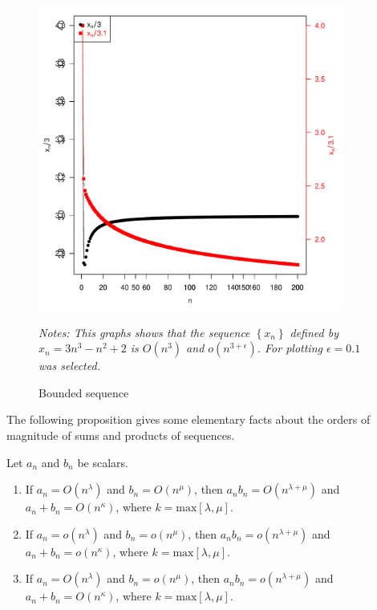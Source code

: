 \documentclass[english,12pt]{book}\usepackage[]{graphicx}\usepackage[]{xcolor}
\newenvironment{knitrout}{}{} %
\begin{document}
\begin{figure}[ht]
  \caption{Bounded sequence}
    \label{fig:SeqConvBond}
    \centering
    \begin{minipage}{.9\linewidth}
\begin{knitrout}
\color{fgcolor}

{\centering \includegraphics[width=10cm,height=10cm]{figure/SeqConvBoun-1} 

}


\end{knitrout}
\footnotesize
		\emph{Notes: This graphs shows that the sequence $\left\lbrace x_n\right\rbrace$ defined by $x_n = 3n^3 - n^2 + 2$ is $O(n^3)$ and $o(n^{3 + \epsilon})$. For plotting $\epsilon = 0.1$ was selected.}
	\end{minipage}
\end{figure}

The following proposition gives some elementary facts about the orders of magnitude of sums and products of sequences.

\begin{proposition}\label{prop:blO-nest}
Let $a_n$ and $b_n$ be scalars. 
\begin{enumerate}
  \item If $a_n=O(n^\lambda)$ and $b_n=O(n^\mu)$, then $a_nb_n=O(n^{\lambda + \mu})$ and $a_n + b_n = O(n^\kappa)$, where $k = \textrm{max}\left[\lambda, \mu\right]$.
  \item If $a_n = o(n^\lambda)$ and $b_n = o(n^\mu)$, then $a_nb_n=o(n^{\lambda + \mu})$ and $a_n + b_n = o(n^\kappa)$, where $k = \textrm{max}\left[\lambda, \mu\right]$.
  \item If $a_n=O(n^\lambda)$ and  $b_n = o(n^\mu)$, then $a_nb_n=o(n^{\lambda + \mu})$ and $a_n + b_n = O(n^\kappa)$, where $k = \textrm{max}\left[\lambda, \mu\right]$.
\end{enumerate}
\end{proposition}
\end{document}
